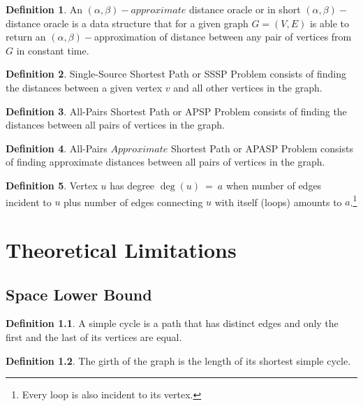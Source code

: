 \documentclass[shortabstract, lic, english]{iithesis}
\theoremstyle{definition} \newtheorem{definition}{Definition}[chapter]
\theoremstyle{plain} \newtheorem{remark}[definition]{Observation}
\theoremstyle{plain} \newtheorem{theorem}[definition]{Theorem}
\theoremstyle{plain} \newtheorem{lemma}[definition]{Lemma}
\theoremstyle{plain} \newtheorem{conjecture}[definition]{Conjecture}
\begin{document}
\begin{definition}
    An $(\alpha,\beta)-approximate$ distance oracle or in short $(\alpha,\beta)-$distance oracle is a data structure that for a given graph $G = (V,E)$ 
    is able to return an $(\alpha, \beta)-$approximation of distance between any pair of vertices from $G$ in constant time.
\end{definition}

\begin{definition}
    Single-Source Shortest Path or SSSP Problem consists of finding the distances between a given vertex $v$ and all other vertices in the graph. 
\end{definition}

\begin{definition}
    All-Pairs Shortest Path or APSP Problem consists of finding the distances between all pairs of vertices in the graph. 
\end{definition}

\begin{definition}
    All-Pairs $Approximate$ Shortest Path or APASP Problem consists of finding approximate distances between all pairs of vertices in the graph. 
\end{definition}

\begin{definition}
    Vertex $u$ has degree $\deg(u)~=~a$ when number of edges incident to $u$ plus number of edges connecting $u$
    with itself (loops) amounts to $a$.\footnote{Every loop is also incident to its vertex.}
\end{definition}

\chapter{Theoretical Limitations} \label{theoreticalLimitations}

\section{Space Lower Bound}
\begin{definition}
    A simple cycle is a path that has distinct edges and only the first and the last of its vertices are equal.
\end{definition}

\begin{definition} 
    The girth of the graph is the length of its shortest simple cycle. 
\end{definition}
\end{document}
